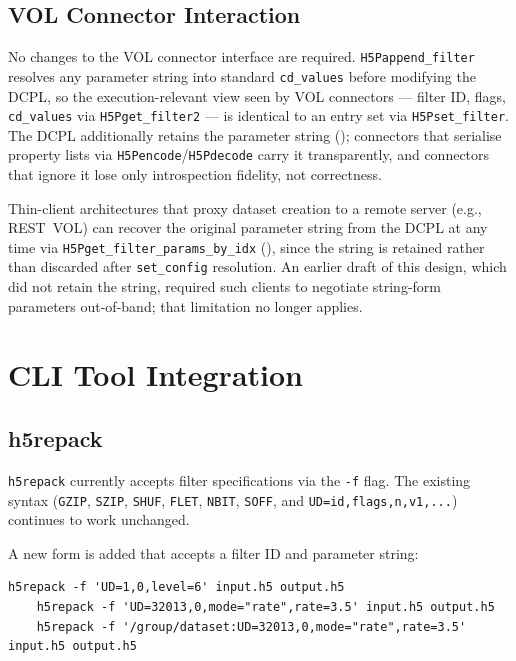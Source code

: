 \documentclass[../RFC-HDFG-2026-001.tex]{subfiles}
\begin{document}
\subsection{VOL Connector Interaction}

No changes to the VOL connector interface are required.
\texttt{H5Pappend\_filter} resolves any parameter string into standard
\texttt{cd\_values} before modifying the DCPL, so the execution-relevant
view seen by VOL connectors --- filter ID, flags, \texttt{cd\_values} via
\texttt{H5Pget\_filter2} --- is identical to an entry set via
\texttt{H5Pset\_filter}.  The DCPL additionally retains the parameter
string (); connectors that serialise
property lists via \texttt{H5Pencode}/\texttt{H5Pdecode} carry it
transparently, and connectors that ignore it lose only introspection
fidelity, not correctness.

Thin-client architectures that proxy dataset creation to a remote server
(e.g., REST~VOL) can recover the original parameter string from the DCPL
at any time via \texttt{H5Pget\_filter\_params\_by\_idx}
(), since the string is retained rather than
discarded after \texttt{set\_config} resolution.  An earlier draft of this
design, which did not retain the string, required such clients to
negotiate string-form parameters out-of-band; that limitation no longer
applies.


\section{CLI Tool Integration}
\label{sec:cli-tools}

\subsection{h5repack}

\texttt{h5repack} currently accepts filter specifications via the \texttt{-f} flag. The
existing syntax (\texttt{GZIP}, \texttt{SZIP}, \texttt{SHUF}, \texttt{FLET}, \texttt{NBIT},
\texttt{SOFF}, and \texttt{UD=id,flags,n,v1,...}) continues to work unchanged.

A new form is added that accepts a filter ID and parameter string:

\begin{Verbatim}[fontsize=\scriptsize]
    h5repack -f 'UD=1,0,level=6' input.h5 output.h5
    h5repack -f 'UD=32013,0,mode="rate",rate=3.5' input.h5 output.h5
    h5repack -f '/group/dataset:UD=32013,0,mode="rate",rate=3.5' input.h5 output.h5
\end{Verbatim}
\end{document}
